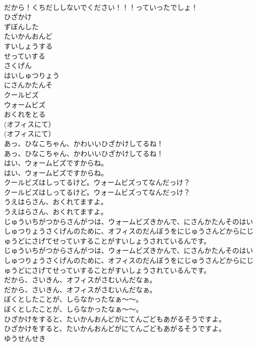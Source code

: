 \documentclass[8pt]{extreport}
\begin{document}
\begin{CJK}{UTF8}{min}
\\	だから！くちだししないでください！！！っていったでしょ！
\\	ひざかけ
\\	ずぼんした
\\	たいかんおんど
\\	すいしょうする
\\	せっていする
\\	さくげん
\\	はいしゅつりょう
\\	にさんかたんそ
\\	クールビズ
\\	ウォームビズ
\\	おくれをとる
\\	(オフィスにて）
\\	(オフィスにて）
\\	あっ、ひなこちゃん、かわいいひざかけしてるね！
\\	あっ、ひなこちゃん、かわいいひざかけしてるね！
\\	はい、ウォームビズですからね。
\\	はい、ウォームビズですからね。
\\	クールビズはしってるけど。ウォームビズってなんだっけ？
\\	クールビズはしってるけど。ウォームビズってなんだっけ？
\\	うえはらさん、おくれてますよ。
\\	うえはらさん、おくれてますよ。
\\	じゅういちがつからさんがつは、ウォームビズきかんで、にさんかたんそのはいしゅつりょうさくげんのために、オフィスのだんぼうをにじゅうさんどからにじゅうどにさげてせっていすることがすいしょうされているんです。
\\	じゅういちがつからさんがつは、ウォームビズきかんで、にさんかたんそのはいしゅつりょうさくげんのために、オフィスのだんぼうをにじゅうさんどからにじゅうどにさげてせっていすることがすいしょうされているんです。
\\	だから、さいきん、オフィスがさむいんだなぁ。
\\	だから、さいきん、オフィスがさむいんだなぁ。
\\	ぼくとしたことが、しらなかったなぁ～～。
\\	ぼくとしたことが、しらなかったなぁ～～。
\\	ひざかけをすると、たいかんおんどがにてんごどもあがるそうですよ。
\\	ひざかけをすると、たいかんおんどがにてんごどもあがるそうですよ。
\\	ゆうせんせき

\end{CJK}
\end{document}
